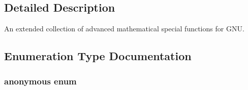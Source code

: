 \subsection{Detailed Description}
An extended collection of advanced mathematical special functions for G\+NU. 

\subsection{Enumeration Type Documentation}
\subsubsection[{\texorpdfstring{anonymous enum}{anonymous enum}}]{\setlength{\rightskip}{0pt plus 5cm}anonymous enum}\hypertarget{group__gnu__math__spec__func_gad6c62dd86a596716cece6ac2d4cfd4b3}{}\label{group__gnu__math__spec__func_gad6c62dd86a596716cece6ac2d4cfd4b3}
